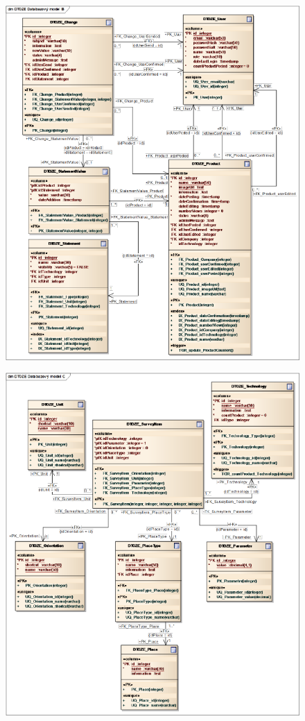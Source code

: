\documentclass[11pt,a4paper]{article}
\begin{document}
\begin{figure}[H] 
\centering  
\includegraphics[scale=0.75]{DTOZE_fyzB_final_n} 
\end{figure}

\begin{figure}[H] 
\centering  
\includegraphics[scale=0.75]{DTOZE_fyzC_final_n} 
\end{figure}
\end{document}
